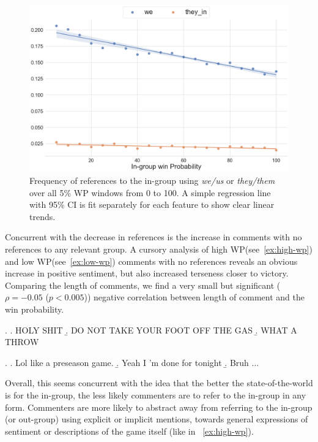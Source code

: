 \begin{figure}[t]
     \centering
     \includegraphics[width=\linewidth]{figures/trends-2.png}
     \caption{Frequency of references to the in-group using \emph{we/us} or \emph{they/them} over all 5\% WP windows from 0 to 100. A simple regression line with 95\% CI is fit separately for each feature to show clear linear trends.}
     \label{fig:trends-2}
 \end{figure}

Concurrent with the decrease in references is the increase in comments with no references to any relevant group. A cursory analysis of high WP(see~\ref{ex:high-wp}) and low WP(see~\ref{ex:low-wp}) comments with no references reveals an obvious increase in positive sentiment, but also increased terseness closer to victory. Comparing the length of comments, we find a very small but significant ($\rho=-0.05$ ($p<0.005$)) negative correlation between length of comment and the win probability.

\ex.\label{ex:high-wp} \a. HOLY SHIT 
     \b. DO NOT TAKE YOUR FOOT OFF THE GAS
     \b. WHAT A THROW
     
\ex.\label{ex:low-wp} \a. Lol like a preseason game.
     \b. Yeah I ’m done for tonight
     \b. Bruh ...



Overall, this seems concurrent with the idea that the better the state-of-the-world is for the in-group, the less likely commenters are to refer to the in-group in any form. Commenters are more likely to abstract away from referring to the in-group (or out-group) using explicit or implicit mentions, towards general expressions of sentiment or descriptions of the game itself (like in ~\ref{ex:high-wp}).
    
